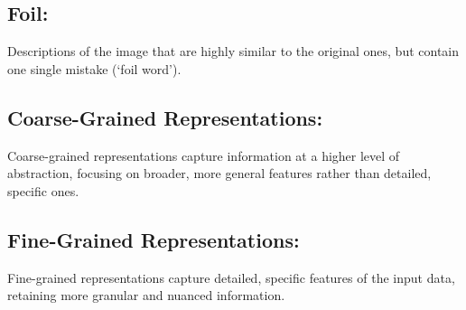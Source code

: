\subsection{Foil:}
Descriptions of the image that are highly similar to the original ones, but contain one single mistake (‘foil word’).
\subsection{Coarse-Grained Representations:} \label{c_grained}
Coarse-grained representations capture information at a higher level of abstraction, focusing on broader, more general features rather than detailed, specific ones.
\subsection{Fine-Grained Representations:} \label{f_grained}
Fine-grained representations capture detailed, specific features of the input data, retaining more granular and nuanced information.

